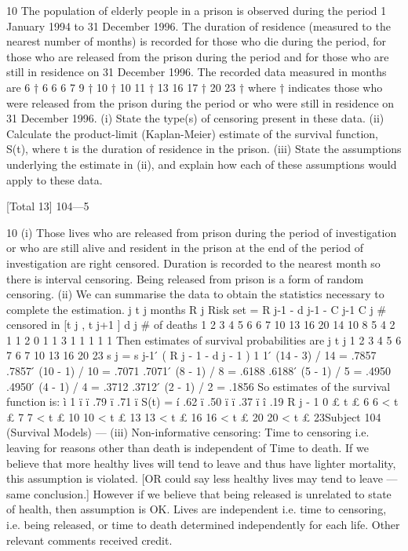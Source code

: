\documentclass[a4paper,12pt]{article}
\begin{document}
10
The population of elderly people in a prison is observed during the period
1 January 1994 to 31 December 1996. The duration of residence (measured to
the nearest number of months) is recorded for those who die during the
period, for those who are released from the prison during the period and for
those who are still in residence on 31 December 1996.
The recorded data measured in months are
6 † 6 6 6 7 9 †
10 † 10 11 † 13 16 17 †
20 23 †
where † indicates those who were released from the prison during the period
or who were still in residence on 31 December 1996.
(i) State the type(s) of censoring present in these data.
(ii) Calculate the product-limit (Kaplan-Meier) estimate of the survival
function, S(t), where t is the duration of residence in the prison.
(iii) State the assumptions underlying the estimate in (ii), and explain how
each of these assumptions would apply to these data.

[Total 13]
104—5

\newpage


10
(i)
Those lives who are released from prison during the period of
investigation or who are still alive and resident in the prison at the end of
the period of investigation are right censored.
Duration is recorded to the nearest month so there is interval censoring.
Being released from prison is a form of random censoring.
(ii)
We can summarise the data to obtain the statistics necessary to complete
the estimation.
j t j
months R j
Risk set
= R j-1 - d j-1 - C j-1 C j
# censored
in [t j , t j+1 ] d j
# of deaths
1
2
3
4
5
6 6
7
10
13
16
20 14
10
8
5
4
2 1
1
2
0
1
1 3
1
1
1
1
1
Then estimates of survival probabilities are
j t j
1
2
3
4
5
6
7 6
7
10
13
16
20
23
s j = s j-1  ́
( R j - 1 - d j - 1 )
1
1  ́ (14 - 3) / 14
= .7857
.7857  ́ (10 - 1) / 10 = .7071
.7071  ́ (8 - 1) / 8 = .6188
.6188  ́ (5 - 1) / 5 = .4950
.4950  ́ (4 - 1) / 4 = .3712
.3712  ́ (2 - 1) / 2 = .1856
So estimates of the survival function is:
ì 1
ï
ï .79
ï .71
ï
S(t) = í .62
ï .50
ï
ï .37
ï
î .19
R j - 1
0 £ t £ 6
6 < t £ 7
7 < t £ 10
10 < t £ 13
13 < t £ 16
16 < t £ 20
20 < t £ 23Subject 104 (Survival Models) — %
(iii)
Non-informative censoring: Time to censoring i.e. leaving for reasons
other than death is independent of Time to death.
If we believe that more healthy lives will tend to leave and thus
have lighter mortality, this assumption is violated. [OR could say
less healthy lives may tend to leave — same conclusion.]
However if we believe that being released is unrelated to state of
health, then assumption is OK.
Lives are independent i.e. time to censoring, i.e. being released, or time to
death determined independently for each life.
Other relevant comments received credit.
\end{document}
